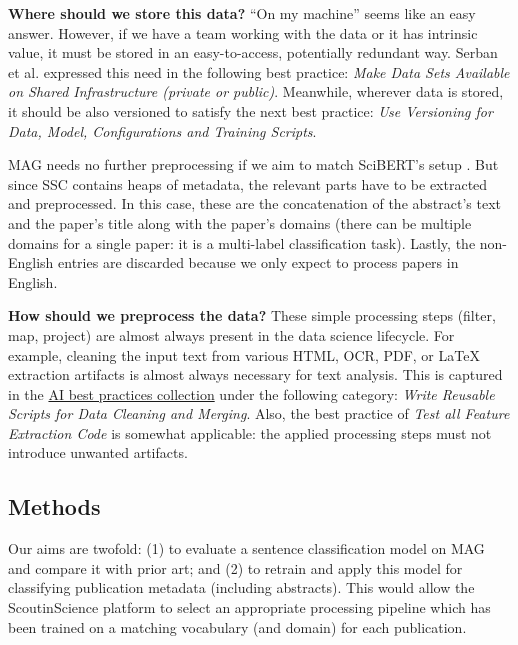 \begin{displayquote}
\textbf{Where should we store this data?} ``On my machine'' seems like an easy answer. However, if we have a team working with the data or it has intrinsic value, it must be stored in an easy-to-access, potentially redundant way. Serban et al. \cite{serban2020adoption} expressed this need in the following best practice: \textit{Make Data Sets Available on Shared Infrastructure (private or public)}. Meanwhile, wherever data is stored, it should be also versioned to satisfy the next best practice: \textit{Use Versioning for Data, Model, Configurations and Training Scripts}.
\end{displayquote}

MAG needs no further preprocessing if we aim to match SciBERT's setup \cite{beltagy2019scibert}. But since SSC contains heaps of metadata, the relevant parts have to be extracted and preprocessed. In this case, these are the concatenation of the abstract's text and the paper's title along with the paper's domains (there can be multiple domains for a single paper: it is a multi-label classification task). Lastly, the non-English entries are discarded because we only expect to process papers in English.

\begin{displayquote}
\textbf{How should we preprocess the data?} These simple processing steps (filter, map, project) are almost always present in the data science lifecycle. For example, cleaning the input text from various HTML, OCR, PDF, or \LaTeX \hskip 0.12cm extraction artifacts is almost always necessary for text analysis. This is captured in the \href{https://se-ml.github.io/practices}{AI best practices collection} under the following category: \textit{Write Reusable Scripts for Data Cleaning and Merging}. Also, the best practice of \textit{Test all Feature Extraction Code} is somewhat applicable: the applied processing steps must not introduce unwanted artifacts.
\end{displayquote}

\subsection{Methods}

Our aims are twofold: (1) to evaluate a sentence classification model on MAG and compare it with prior art; and (2) to retrain and apply this model for classifying publication metadata (including abstracts). This would allow the ScoutinScience platform to select an appropriate processing pipeline which has been trained on a matching vocabulary (and domain) for each publication. 

